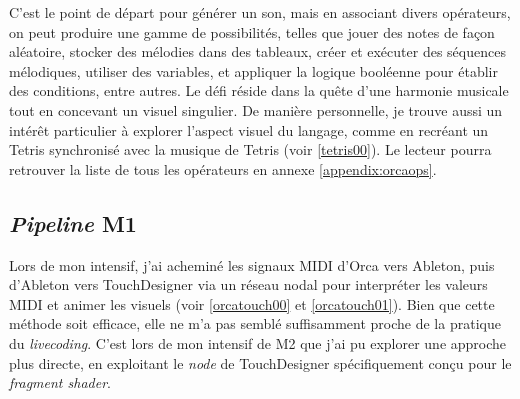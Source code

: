C'est le point de départ pour générer un son, mais en associant divers opérateurs, on peut produire une gamme de possibilités, telles que jouer  des notes de façon aléatoire, stocker des mélodies dans des tableaux, créer et exécuter des séquences mélodiques, utiliser des variables, et appliquer la logique booléenne pour établir des conditions, entre autres. Le défi réside dans la quête d'une harmonie musicale tout en concevant un visuel singulier. De manière personnelle, je trouve aussi un intérêt particulier à explorer l'aspect visuel du langage, comme en recréant un Tetris synchronisé avec la musique de Tetris (voir \ref{tetris00}). Le lecteur pourra retrouver la liste de tous les opérateurs en annexe \ref{appendix:orcaops}.


\subsection*{\textit{Pipeline} M1}
Lors de mon intensif, j'ai acheminé les signaux MIDI d'Orca vers Ableton, puis d'Ableton vers TouchDesigner via un réseau nodal pour interpréter les valeurs MIDI et animer les visuels (voir \ref{orcatouch00} et \ref{orcatouch01}).
Bien que cette méthode soit efficace, elle ne m'a pas semblé suffisamment proche de la pratique du \textit{livecoding}. C'est lors de mon intensif de M2 que j'ai pu explorer une approche plus directe, en exploitant le \textit{node} de TouchDesigner spécifiquement conçu pour le \textit{fragment shader}.


